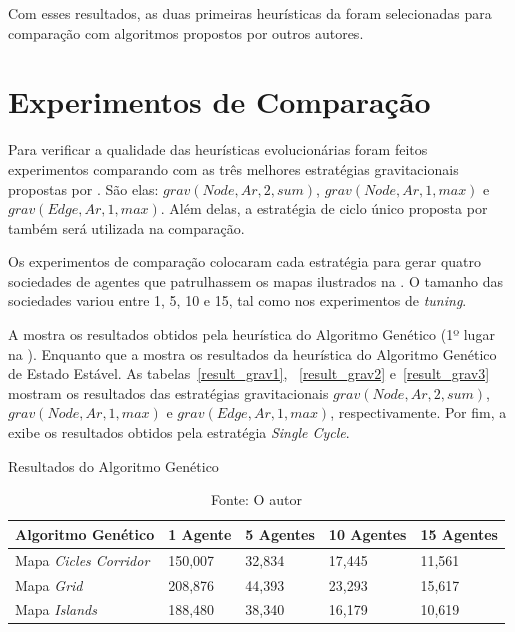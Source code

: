 Com esses resultados, as duas primeiras heurísticas da  foram 
selecionadas para comparação com algoritmos propostos por outros autores.

\section{Experimentos de Comparação}

Para verificar a qualidade das heurísticas evolucionárias foram feitos 
experimentos comparando com as três melhores estratégias gravitacionais 
propostas por \citep{sampaiophd}. São elas: $grav(Node,Ar,2,sum)$, 
$grav(Node,Ar,1,max)$ e $grav(Edge,Ar,1,max)$. Além delas, a estratégia de ciclo 
único proposta por \citep{Chevaleyre:2004:TAM:1018411.1019013} também será 
utilizada na comparação.

Os experimentos de comparação colocaram cada estratégia para gerar quatro 
sociedades de agentes que patrulhassem os mapas ilustrados na 
. O tamanho das sociedades variou entre 1, 5, 10 e 15, tal 
como nos experimentos de \textit{tuning}.

A  mostra os resultados obtidos pela heurística do 
Algoritmo Genético (1º lugar na ). Enquanto que a 
 mostra os resultados da heurística do Algoritmo 
Genético de Estado Estável. As tabelas~\ref{result_grav1}, ~\ref{result_grav2} 
e~\ref{result_grav3} mostram os resultados das estratégias gravitacionais 
$grav(Node,Ar,2,sum)$, $grav(Node,Ar,1,max)$ e $grav(Edge,Ar,1,max)$, 
respectivamente. Por fim, a  exibe os resultados obtidos 
pela estratégia \textit{Single Cycle}.

\begin{table}
	\centering
	\caption{Resultados do Algoritmo Genético}
	\label{result_genetic}
	\begin{tabularx}{\linewidth}{|X|X|X|X|X|}
		\hline
		\textbf{Algoritmo Genético} & \textbf{1 Agente} & \textbf{5 Agentes} & \textbf{10 Agentes} & \textbf{15 Agentes} \\
		\hline
		Mapa \textit{Cicles Corridor} & 150,007 & 32,834 & 17,445 & 11,561 \\
		\hline
		Mapa \textit{Grid} & 208,876 & 44,393 & 23,293 & 15,617 \\
		\hline
		Mapa \textit{Islands} & 188,480 & 38,340 & 16,179 & 10,619 \\
		\hline
	\end{tabularx}
	\caption*{Fonte: O autor}
\end{table}

